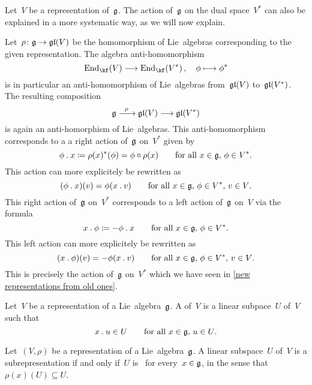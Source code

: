\begin{remark}
  Let~$V$ be a representation of~$\mathfrak{g}$.
  The action of~$\mathfrak{g}$ on the dual space~$V^*$ can also be explained in a more systematic way, as we will now explain.

  Let~$\rho \colon \glie \to \gllie(V)$ be the homomorphism of Lie~algebras corresponding to the given representation.
  The algebra anti-homomorphism
  \[
    \End_{\kf}(V)
    \to
    \End_{\kf}(V^*) \,,
    \quad
    \phi
    \mapsto
    \phi^*
  \]
  is in particular an anti-homomorphism of Lie~algebras from~$\mathfrak{gl}(V)$ to~$\mathfrak{gl}(V^*)$.
  The resulting composition
  \[
    \glie
    \xto{\rho}
    \gllie(V)
    \to
    \gllie(V^*)
  \]
  is again an anti-homorphism of Lie~algebras.
  This anti-homomorphism corresponds to a a right action of~$\mathfrak{g}$ on~$V^*$ given by
  \[
    \phi \mathbin{.} x
    \coloneqq
    \rho(x)^*(\phi)
    =
    \phi \circ \rho(x)
    \qquad
    \text{for all~$x \in \mathfrak{g}$,~$\phi \in V^*$.}
  \]
  This action can more explicitely be rewritten as
  \[
    (\phi \mathbin{.} x)(v)
    =
    \phi(x \mathbin{.} v)
    \qquad
    \text{for all~$x \in \mathfrak{g}$,~$\phi \in V^*$,~$v \in V$.}
  \]
  This right action of~$\mathfrak{g}$ on~$V^*$ corresponds to a left action of~$\mathfrak{g}$ on~$V$ via the formula
  \[
    x \mathbin{.} \phi
    \coloneqq
    -\phi \mathbin{.} x
    \qquad
    \text{for all~$x \in \mathfrak{g}$,~$\phi \in V^*$.}
  \]
  This left action can more explicitely be rewritten as
  \[
    (x \mathbin{.} \phi)(v)
    =
    -\phi(x \mathbin{.} v)
    \qquad
    \text{for all~$x \in \mathfrak{g}$,~$\phi \in V^*$,~$v \in V$.}
  \]
  This is precisely the action of~$\mathfrak{g}$ on~$V^*$ which we have seen in \cref{new representations from old ones}.
\end{remark}


\begin{definition}
  Let~$V$ be a representation of a Lie~algebra~$\mathfrak{g}$.
  A  of~$V$ is a linear subpace~$U$ of~$V$ such that
  \[
    x \mathbin{.} u \in U
    \qquad
    \text{for all~$x \in \mathfrak{g}$,~$u \in U$.}
  \]
\end{definition}


\begin{remark}
  Let~$(V, \rho)$ be a representation of a Lie~algebra~$\mathfrak{g}$.
  A linear subspace~$U$ of~$V$ is a subrepresentation if and only if~$U$ is~{} for every~$x \in \mathfrak{g}$, in the sense that~$\rho(x)(U) \subseteq U$.
\end{remark}


